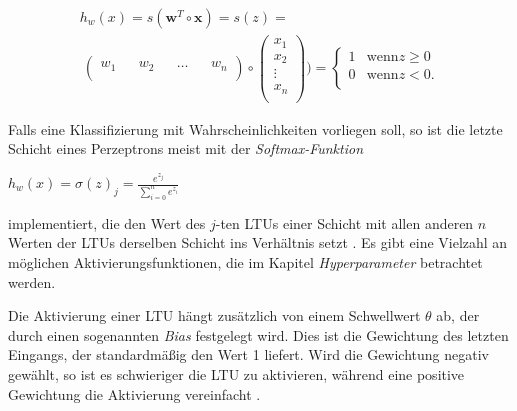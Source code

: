 \begin{equation} \label{heaviside}
\begin{split}
h_{w}(x) = s(\boldsymbol{w}^{T} \circ \boldsymbol{x}) = s(z) = \\\ \begin{pmatrix} 
w_{1}&&w_{2}&&\dots&& w_{n}\\ 
\end{pmatrix} 
\circ 
\begin{pmatrix} x_{1}\\
x_{2}\\
\vdots\\
x_{n}\\
\end{pmatrix}) = 
\begin{cases}
1 & \text{wenn} z \geq 0 \\
0 & \text{wenn} z < 0 .\\
\end{cases}
\end{split}
\end{equation}

Falls eine Klassifizierung mit Wahrscheinlichkeiten vorliegen soll, so ist die letzte Schicht eines Perzeptrons meist mit der \textit{Softmax-Funktion}

\begin{center}
$
h_{w}(x) = \sigma(z)_j = \frac{e^{z_j}}{\sum_{i=0}^n e^{z_i} }
$
\end{center}

implementiert, die den Wert des $j$-ten LTUs einer Schicht mit allen anderen $n$ Werten der LTUs derselben Schicht ins Verhältnis setzt \cite{AurelienGeron.2018}. Es gibt eine Vielzahl an möglichen Aktivierungsfunktionen, die im Kapitel \textit{Hyperparameter} betrachtet werden.

Die Aktivierung einer LTU hängt zusätzlich von einem Schwellwert $\theta$ ab, der durch einen sogenannten \textit{Bias} festgelegt wird. Dies ist die Gewichtung des letzten Eingangs, der standardmäßig den Wert 1 liefert. Wird die Gewichtung negativ gewählt, so ist es schwieriger die LTU zu aktivieren, während eine positive Gewichtung die Aktivierung vereinfacht \cite{AurelienGeron.2018}.

